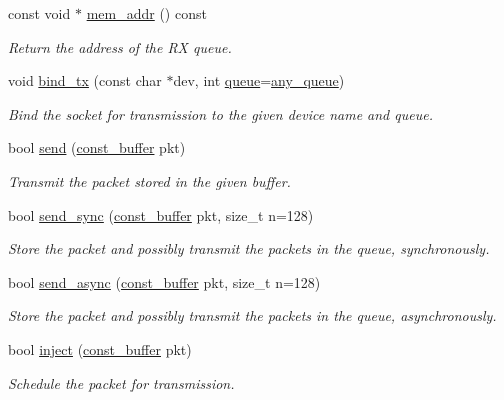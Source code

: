 \begin{DoxyCompactItemize}
const void $\ast$ \hyperlink{classnet_1_1pfq_a1f16289a4ddffd497ef2dd9c7523bccb}{mem\-\_\-addr} () const 
\begin{DoxyCompactList}\small\item\em Return the address of the R\-X queue. \end{DoxyCompactList}\item 
void \hyperlink{classnet_1_1pfq_a00ba716bc74388ec7facc7c59d92fa6d}{bind\-\_\-tx} (const char $\ast$dev, int \hyperlink{classnet_1_1queue}{queue}=\hyperlink{classnet_1_1pfq_a0d4eca6d0925b7c49365675c9cf9385c}{any\-\_\-queue})
\begin{DoxyCompactList}\small\item\em Bind the socket for transmission to the given device name and queue. \end{DoxyCompactList}\item 
bool \hyperlink{classnet_1_1pfq_a9bd5ed424666bbfc6c54de476b3ee274}{send} (\hyperlink{namespacenet_a05639001760fe5164b163078b5ccc2c0}{const\-\_\-buffer} pkt)
\begin{DoxyCompactList}\small\item\em Transmit the packet stored in the given buffer. \end{DoxyCompactList}\item 
bool \hyperlink{classnet_1_1pfq_adfa55afc44e561314349bf5995c06bae}{send\-\_\-sync} (\hyperlink{namespacenet_a05639001760fe5164b163078b5ccc2c0}{const\-\_\-buffer} pkt, size\-\_\-t n=128)
\begin{DoxyCompactList}\small\item\em Store the packet and possibly transmit the packets in the queue, synchronously. \end{DoxyCompactList}\item 
bool \hyperlink{classnet_1_1pfq_a133184c3a7eee9b8110941436de0a05d}{send\-\_\-async} (\hyperlink{namespacenet_a05639001760fe5164b163078b5ccc2c0}{const\-\_\-buffer} pkt, size\-\_\-t n=128)
\begin{DoxyCompactList}\small\item\em Store the packet and possibly transmit the packets in the queue, asynchronously. \end{DoxyCompactList}\item 
bool \hyperlink{classnet_1_1pfq_ac3ff560f61fb181bbc94f305c8f98569}{inject} (\hyperlink{namespacenet_a05639001760fe5164b163078b5ccc2c0}{const\-\_\-buffer} pkt)
\begin{DoxyCompactList}\small\item\em Schedule the packet for transmission. \end{DoxyCompactList}\item 

\end{DoxyCompactItemize}
